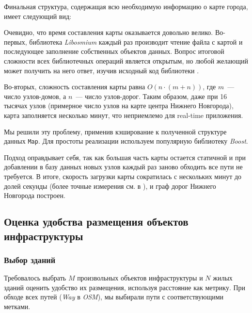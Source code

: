 \documentclass[11pt]{article}
\begin{document}
	Финальная структура, содержащая всю необходимую информацию о карте города, имеет следующий вид:
	
	
	
	Очевидно, что время составления карты оказывается довольно велико.
	Во-первых, библиотека \textit{Libosmium} каждый раз производит чтение файла с картой и последующее заполнение собственных объектов данных.
	Вопрос итоговой сложности всех библиотечных операций является открытым, но любой желающий может получить на него ответ, изучив исходный код библиотеки \cite{libosm-code}.
	
	Во-вторых, сложность составления карты равна $ O(n \cdot (m + n)) $, где $ m $~--- число узлов-домов, а $ n $~--- число узлов-дорог.
	Таким образом, даже при 16 тысячах узлов (примерное число узлов на карте центра Нижнего Новгорода), карта заполняется несколько минут, что неприемлемо для real-time приложения.
	
	Мы решили эту проблему, применив кэширование к полученной структуре данных \texttt{Map}.
	Для простоты реализации используем популярную библиотеку \textit{Boost}.
	
	
	
	
	Подход оправдывает себя, так как большая часть карты остается статичной и при добавлении в базу данных новых узлов каждый раз заново обходить все пути не требуется.
	В итоге, скорость загрузки карты сократилась с нескольких минут до долей секунды (более точные измерения см. в ), и граф дорог Нижнего Новгорода построен.
	
    \subsection{Оценка удобства размещения объектов инфраструктуры}
    
    \subsubsection{Выбор зданий}
    
    Требовалось выбрать $ M $ произвольных объектов инфраструктуры и $ N $ жилых зданий оценить удобство их размещения, используя расстояние как метрику.
    При обходе всех путей (\textit{Way} в \textit{OSM}), мы выбирали пути с соответствующими метками.
    
    
    
\end{document}
